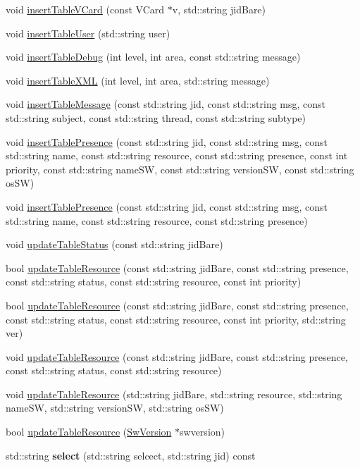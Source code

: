 \begin{DoxyCompactItemize}
\item 
void \hyperlink{classDatabase_a1bc61aab7507950d0cca002b05693fd1}{insertTableVCard} (const VCard $\ast$v, std::string jidBare)
\item 
void \hyperlink{classDatabase_ae3d08a778ad3e3bb916b9a0710e17591}{insertTableUser} (std::string user)
\item 
void \hyperlink{classDatabase_adf308c272ed2354c9b4b0adec7e7514c}{insertTableDebug} (int level, int area, const std::string message)
\item 
void \hyperlink{classDatabase_a91c467c7d88fa73d47f90b00810639ce}{insertTableXML} (int level, int area, std::string message)
\item 
void \hyperlink{classDatabase_a9d4abee71fe85d95e34537212a2b1860}{insertTableMessage} (const std::string jid, const std::string msg, const std::string subject, const std::string thread, const std::string subtype)
\item 
void \hyperlink{classDatabase_ac224d84f32afe5b4700339b4ed1cbcba}{insertTablePresence} (const std::string jid, const std::string msg, const std::string name, const std::string resource, const std::string presence, const int priority, const std::string nameSW, const std::string versionSW, const std::string osSW)
\item 
void \hyperlink{classDatabase_a23e89aa424f735e5510760e6dcb5e7ae}{insertTablePresence} (const std::string jid, const std::string msg, const std::string name, const std::string resource, const std::string presence)
\item 
void \hyperlink{classDatabase_a277f3480f7ac16380ea0195d2a3d1c14}{updateTableStatus} (const std::string jidBare)
\item 
bool \hyperlink{classDatabase_af70354123caedcc69d3ce905e04c35ff}{updateTableResource} (const std::string jidBare, const std::string presence, const std::string status, const std::string resource, const int priority)
\item 
bool \hyperlink{classDatabase_a808c8a5de4206ca72a69a122b8832811}{updateTableResource} (const std::string jidBare, const std::string presence, const std::string status, const std::string resource, const int priority, std::string ver)
\item 
void \hyperlink{classDatabase_a9abb11cd73e399d8f872ed6a19ff1d0c}{updateTableResource} (const std::string jidBare, const std::string presence, const std::string status, const std::string resource)
\item 
void \hyperlink{classDatabase_a3d21c62cf45f895d5bea438b1279370d}{updateTableResource} (std::string jidBare, std::string resource, std::string nameSW, std::string versionSW, std::string osSW)
\item 
bool \hyperlink{classDatabase_ae80a2a2b6a33748bee20b62780f43fc3}{updateTableResource} (\hyperlink{classSwVersion}{SwVersion} $\ast$swversion)
\item 
\hypertarget{classDatabase_a321fd8c09dea22cc061b61ebd5667c66}{
std::string {\bfseries select} (std::string selcect, std::string jid) const }
\label{classDatabase_a321fd8c09dea22cc061b61ebd5667c66}


\end{DoxyCompactItemize}
